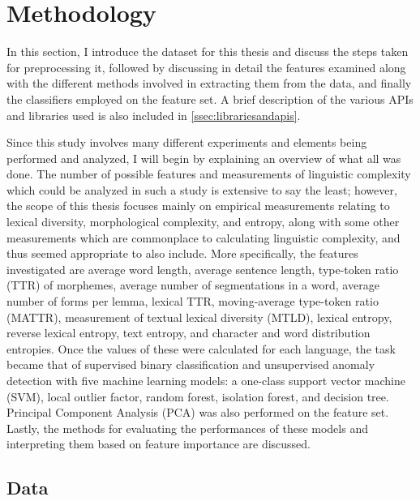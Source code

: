 \documentclass[12pt,a4paper]{article}
\numberwithin{figure}{section}
\numberwithin{table}{section}
\numberwithin{definition}{section}
\begin{document}
\newpage
\section{Methodology}
\label{sec:methodology}

In this section, I introduce the dataset for this thesis and discuss the steps taken for preprocessing it, followed by discussing in detail the features examined along with the different methods involved in extracting them from the data, and finally the classifiers employed on the feature set. A brief description of the various APIs and libraries used is also included in \ref{ssec:librariesandapis}. 

Since this study involves many different experiments and elements being performed and analyzed, I will begin by explaining an overview of what all was done. The number of possible features and measurements of linguistic complexity which could be analyzed in such a study is extensive to say the least; however, the scope of this thesis focuses mainly on empirical measurements relating to lexical diversity, morphological complexity, and entropy, along with some other measurements which are commonplace to calculating linguistic complexity, and thus seemed appropriate to also include. More specifically, the features investigated are average word length, average sentence length, type-token ratio (TTR) of morphemes, average number of segmentations in a word, average number of forms per lemma, lexical TTR, moving-average type-token ratio (MATTR), measurement of textual lexical diversity (MTLD), lexical entropy, reverse lexical entropy, text entropy, and character and word distribution entropies. Once the values of these were calculated for each language, the task became that of supervised binary classification and unsupervised anomaly detection with five machine learning models: a one-class support vector machine (SVM), local outlier factor, random forest, isolation forest, and decision tree. Principal Component Analysis (PCA) was also performed on the feature set. Lastly, the methods for evaluating the performances of these models and interpreting them based on feature importance are discussed.

\subsection{Data}
\label{ssec:data}

\end{document}
